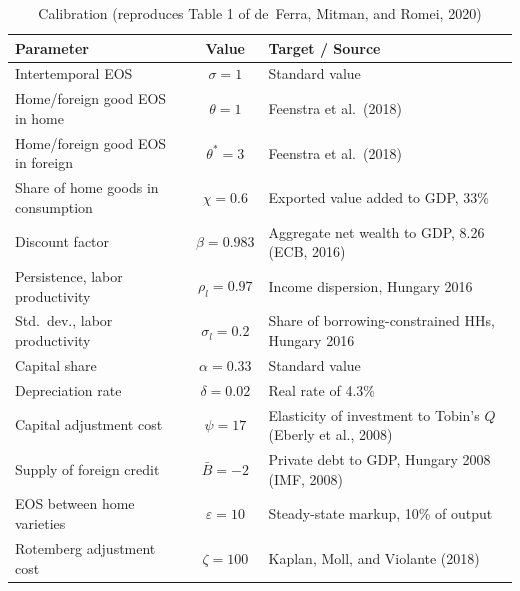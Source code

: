 \documentclass[\latexroot/\projectname]{subfiles}
\begin{document}
%

\begin{table}[htb]
  \centering
  \caption{Calibration (reproduces Table 1 of de~Ferra, Mitman, and Romei, 2020)%
    \whenintegrated{\label{tab:deFerra2020_calibration}}}
  \footnotesize
  \renewcommand{\arraystretch}{1.2}
  \setlength{\tabcolsep}{5pt}
  \begin{tabular}{@{}p{}c p{}@{}}
    \toprule
    \textbf{Parameter} & \textbf{Value} & \textbf{Target / Source} \\
    \midrule
    Intertemporal EOS                        & $\sigma = 1$       & Standard value \\
    Home/foreign good EOS in home            & $\theta = 1$       & Feenstra et al.\ (2018) \\
    Home/foreign good EOS in foreign         & $\theta^{*} = 3$   & Feenstra et al.\ (2018) \\
    Share of home goods in consumption       & $\chi = 0.6$       & Exported value added to GDP, 33\% \\
    Discount factor                          & $\beta = 0.983$    & Aggregate net wealth to GDP, 8.26 (ECB, 2016) \\
    Persistence, labor productivity          & $\rho_{l} = 0.97$  & Income dispersion, Hungary 2016 \\
    Std.\ dev., labor productivity           & $\sigma_{l} = 0.2$ & Share of borrowing-constrained HHs, Hungary 2016 \\
    Capital share                            & $\alpha = 0.33$    & Standard value \\
    Depreciation rate                        & $\delta = 0.02$    & Real rate of 4.3\% \\
    Capital adjustment cost                  & $\psi = 17$        & Elasticity of investment to Tobin's $Q$ (Eberly et al., 2008) \\
    Supply of foreign credit                 & $\bar{B} = -2$     & Private debt to GDP, Hungary 2008 (IMF, 2008) \\
    EOS between home varieties               & $\varepsilon = 10$ & Steady-state markup, 10\% of output \\
    Rotemberg adjustment cost                & $\zeta = 100$      & Kaplan, Moll, and Violante (2018) \\
    \bottomrule
  \end{tabular}


\end{table}
\end{document}
